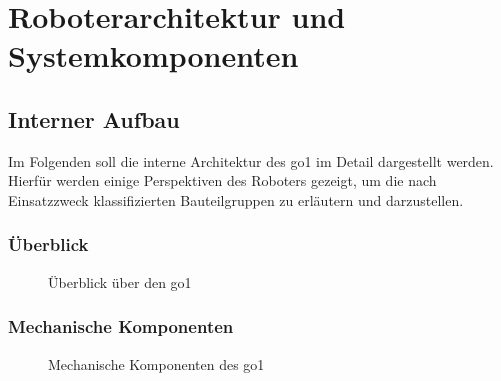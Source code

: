 \section{Roboterarchitektur und Systemkomponenten}

\subsection{Interner Aufbau}
Im Folgenden soll die interne Architektur des \gls{go1} im Detail dargestellt werden.
Hierfür werden einige Perspektiven des Roboters gezeigt, um die nach Einsatzzweck klassifizierten Bauteilgruppen zu erläutern und darzustellen.

\subsubsection{Überblick}

\begin{figure}[h]
    \caption{Überblick über den \gls{go1}}\label{fig:allgemeine_architektur}
\end{figure}

\subsubsection{Mechanische Komponenten}

\begin{figure}[h]
    \caption{Mechanische Komponenten des \gls{go1}}\label{fig:mechanische_komponenten}
\end{figure}

